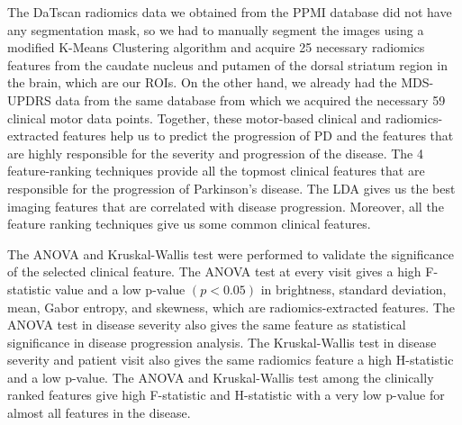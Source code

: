 \documentclass[twocolumn]{article}
\begin{document}
The DaTscan radiomics data we obtained from the PPMI database did not have any segmentation mask, so we had to manually segment the images using a modified K-Means Clustering algorithm and acquire 25 necessary radiomics features from the caudate nucleus and putamen of the dorsal striatum region in the brain, which are our ROIs. On the other hand, we already had the MDS-UPDRS data from the same database from which we acquired the necessary 59 clinical motor data points. Together, these motor-based clinical and radiomics-extracted features help us to predict the progression of PD and the features that are highly responsible for the severity and progression of the disease. The 4 feature-ranking techniques provide all the topmost clinical features that are responsible for the progression of Parkinson's disease. The LDA gives us the best imaging features that are correlated with disease progression. Moreover, all the feature ranking techniques give us some common clinical features. 

The ANOVA and Kruskal-Wallis test were performed to validate the significance of the selected clinical feature. The ANOVA test at every visit gives a high F-statistic value and a low p-value $(p < 0.05)$ in brightness, standard deviation, mean, Gabor entropy, and skewness, which are radiomics-extracted features. The ANOVA test in disease severity also gives the same feature as statistical significance in disease progression analysis. The Kruskal-Wallis test in disease severity and patient visit also gives the same radiomics feature a high H-statistic and a low p-value. The ANOVA and Kruskal-Wallis test among the clinically ranked features give high F-statistic and H-statistic with a very low p-value for almost all features in the disease. 
\end{document}
